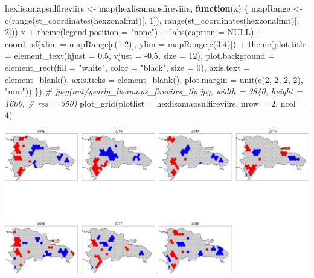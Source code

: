 \documentclass[10pt,landscape,a3paper]{article}
\newenvironment{Shaded}{\begin{snugshade}}{\end{snugshade}}
\newcommand{\AttributeTok}[1]{\textcolor[rgb]{0.77,0.63,0.00}{#1}}
\newcommand{\CommentTok}[1]{\textcolor[rgb]{0.56,0.35,0.01}{\textit{#1}}}
\newcommand{\ConstantTok}[1]{\textcolor[rgb]{0.00,0.00,0.00}{#1}}
\newcommand{\ControlFlowTok}[1]{\textcolor[rgb]{0.13,0.29,0.53}{\textbf{#1}}}
\newcommand{\DecValTok}[1]{\textcolor[rgb]{0.00,0.00,0.81}{#1}}
\newcommand{\FloatTok}[1]{\textcolor[rgb]{0.00,0.00,0.81}{#1}}
\newcommand{\FunctionTok}[1]{\textcolor[rgb]{0.00,0.00,0.00}{#1}}
\newcommand{\NormalTok}[1]{#1}
\newcommand{\OtherTok}[1]{\textcolor[rgb]{0.56,0.35,0.01}{#1}}
\newcommand{\SpecialCharTok}[1]{\textcolor[rgb]{0.00,0.00,0.00}{#1}}
\newcommand{\StringTok}[1]{\textcolor[rgb]{0.31,0.60,0.02}{#1}}
\begin{document}
\begin{Shaded}
\begin{Highlighting}[]
\NormalTok{hexlisamapsnlfireviirs }\OtherTok{\textless{}{-}} \FunctionTok{map}\NormalTok{(hexlisamapsfireviirs, }\ControlFlowTok{function}\NormalTok{(x) \{}
\NormalTok{    mapRange }\OtherTok{\textless{}{-}} \FunctionTok{c}\NormalTok{(}\FunctionTok{range}\NormalTok{(}\FunctionTok{st\_coordinates}\NormalTok{(hexzonalfmt)[, }\DecValTok{1}\NormalTok{]), }\FunctionTok{range}\NormalTok{(}\FunctionTok{st\_coordinates}\NormalTok{(hexzonalfmt)[,}
        \DecValTok{2}\NormalTok{]))}
\NormalTok{    x }\SpecialCharTok{+} \FunctionTok{theme}\NormalTok{(}\AttributeTok{legend.position =} \StringTok{"none"}\NormalTok{) }\SpecialCharTok{+} \FunctionTok{labs}\NormalTok{(}\AttributeTok{caption =} \ConstantTok{NULL}\NormalTok{) }\SpecialCharTok{+} \FunctionTok{coord\_sf}\NormalTok{(}\AttributeTok{xlim =}\NormalTok{ mapRange[}\FunctionTok{c}\NormalTok{(}\DecValTok{1}\SpecialCharTok{:}\DecValTok{2}\NormalTok{)],}
        \AttributeTok{ylim =}\NormalTok{ mapRange[}\FunctionTok{c}\NormalTok{(}\DecValTok{3}\SpecialCharTok{:}\DecValTok{4}\NormalTok{)]) }\SpecialCharTok{+} \FunctionTok{theme}\NormalTok{(}\AttributeTok{plot.title =} \FunctionTok{element\_text}\NormalTok{(}\AttributeTok{hjust =} \FloatTok{0.5}\NormalTok{, }\AttributeTok{vjust =} \SpecialCharTok{{-}}\FloatTok{0.5}\NormalTok{,}
        \AttributeTok{size =} \DecValTok{12}\NormalTok{), }\AttributeTok{plot.background =} \FunctionTok{element\_rect}\NormalTok{(}\AttributeTok{fill =} \StringTok{"white"}\NormalTok{, }\AttributeTok{color =} \StringTok{"black"}\NormalTok{,}
        \AttributeTok{size =} \DecValTok{0}\NormalTok{), }\AttributeTok{axis.text =} \FunctionTok{element\_blank}\NormalTok{(), }\AttributeTok{axis.ticks =} \FunctionTok{element\_blank}\NormalTok{(), }\AttributeTok{plot.margin =} \FunctionTok{unit}\NormalTok{(}\FunctionTok{c}\NormalTok{(}\DecValTok{2}\NormalTok{,}
        \DecValTok{2}\NormalTok{, }\DecValTok{2}\NormalTok{, }\DecValTok{2}\NormalTok{), }\StringTok{"mm"}\NormalTok{))}
\NormalTok{\})}
\CommentTok{\# jpeg(\textquotesingle{}out/yearly\_lisamaps\_fireviirs\_tlp.jpg\textquotesingle{}, width = 3840, height = 1600,}
\CommentTok{\# res = 350)}
\FunctionTok{plot\_grid}\NormalTok{(}\AttributeTok{plotlist =}\NormalTok{ hexlisamapsnlfireviirs, }\AttributeTok{nrow =} \DecValTok{2}\NormalTok{, }\AttributeTok{ncol =} \DecValTok{4}\NormalTok{)}
\end{Highlighting}
\end{Shaded}

\begin{center}\includegraphics{img/modelling/aa-lisa-maps-4} \end{center}
\end{document}
